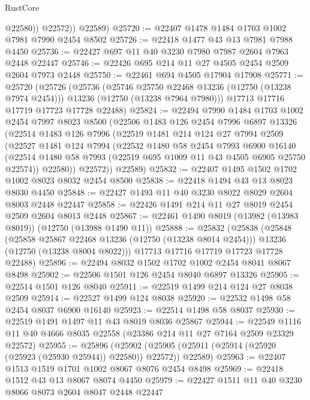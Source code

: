 \begin{lexlean}{RustCore}
\begin{coremodule}
              @22580))
          @22572))
      @22589)
@25720 := @22407 @1478 @1484 @1703 @1002 @7981 @7990 @2454 @8502
@25726 := @22418 @1477 @43 @13 @7981 @7988 @4450
@25736 := @22427 @697 @11 @40 @3230 @7980 @7987 @2604 @7963 @2448 @22447
@25746 := @22426 @695 @214 @11 @27 @4505 @2454 @2509 @2604 @7973 @2448
@25750 := @22461 @694 @4505 @17904 @17908
@25771 := @25720
    (@25726
      (@25736
        (@25746 @25750 @22468 @13236 (@12750 (@13238 @7974 @2454)))
        @13236
        (@12750 (@13238 @7964 @7980)))
      @17713
      @17716
      @17719
      @17723
      @17728
      @22488)
@25824 := @22494
    @7990
    @1484
    @1703
    @1002
    @2454
    @7997
    @8023
    @8500
    (@22506
      @1483
      @126
      @2454
      @7996
      @6897
      @13326
      (@22514
        @1483
        @126
        @7996
        (@22519
          @1481
          @214
          @124
          @27
          @7994
          @2509
          (@22527
            @1481
            @124
            @7994
            (@22532
              @1480
              @58
              @2454
              @7993
              @6900
              @16140
              (@22514 @1480 @58 @7993 (@22519 @695 @1009 @11 @43 @4505 @6905 @25750 @22574))
              @22580))
          @22572))
      @22589)
@25832 := @22407 @1495 @1502 @1702 @1002 @8023 @8032 @2454 @8500
@25838 := @22418 @1494 @43 @13 @8023 @8030 @4450
@25848 := @22427 @1493 @11 @40 @3230 @8022 @8029 @2604 @8003 @2448 @22447
@25858 := @22426 @1491 @214 @11 @27 @8019 @2454 @2509 @2604 @8013 @2448
@25867 := @22461 @1490 @8019 (@13982 (@13983 @8019)) (@12750 (@13988 @1490 @11))
@25888 := @25832
    (@25838
      (@25848
        (@25858 @25867 @22468 @13236 (@12750 (@13238 @8014 @2454)))
        @13236
        (@12750 (@13238 @8004 @8022)))
      @17713
      @17716
      @17719
      @17723
      @17728
      @22488)
@25896 := @22494 @8032 @1502 @1702 @1002 @2454 @8041 @8067 @8498
@25902 := @22506 @1501 @126 @2454 @8040 @6897 @13326
@25905 := @22514 @1501 @126 @8040
@25911 := @22519 @1499 @214 @124 @27 @8038 @2509
@25914 := @22527 @1499 @124 @8038
@25920 := @22532 @1498 @58 @2454 @8037 @6900 @16140
@25923 := @22514 @1498 @58 @8037
@25930 := @22519 @1491 @1497 @11 @43 @8019 @8036 @25867
@25944 := @22549 @1116 @11 @40 @4666 @8035 @22558 (@23386 @214 @11 @27 @7164 @2509 @23329 @22572)
@25955 := @25896
    (@25902 (@25905 (@25911 (@25914 (@25920 (@25923 (@25930 @25944)) @22580)) @22572)) @22589)
@25963 := @22407 @1513 @1519 @1701 @1002 @8067 @8076 @2454 @8498
@25969 := @22418 @1512 @43 @13 @8067 @8074 @4450
@25979 := @22427 @1511 @11 @40 @3230 @8066 @8073 @2604 @8047 @2448 @22447

\end{coremodule}
\end{lexlean}

